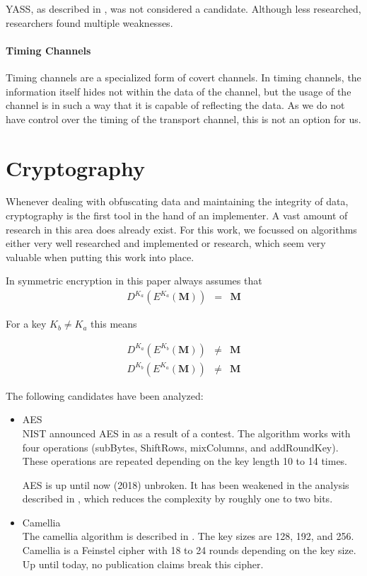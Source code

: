 
YASS, as described in \cite{solanki2007yass}, was not considered a candidate. Although less researched, researchers found multiple weakness\-es\cite{kodovsky2010modern,li2009steganalysis}.

\subsubsection{Timing Channels}

Timing channels are a specialized form of covert channels. In timing channels, the information itself hides not within the data of the channel, but the usage of the channel is in such a way that it is capable of reflecting the data. As we do not have control over the timing of the transport channel, this is not an option for us.

\chapter{Cryptography}

Whenever dealing with obfuscating data and maintaining the integrity of data, cryptography is the first tool in the hand of an implementer. A vast amount of research in this area does already exist. For this work, we focussed on algorithms either very well researched and implemented or research, which seem very valuable when putting this work into place. 

In symmetric encryption in this paper always assumes that
\begin{eqnarray}
D^{K_a}\left(E^{K_a}\left(\mathbf{M}\right)\right) & = & \mathbf{M}
\end{eqnarray} 

For a key $K_b\neq K_a$ this means

\begin{eqnarray}
D^{K_a}\left(E^{K_b}\left(\mathbf{M}\right)\right) & \neq & \mathbf{M}\\
D^{K_b}\left(E^{K_a}\left(\mathbf{M}\right)\right) & \neq & \mathbf{M}
\end{eqnarray} 

The following candidates have been analyzed:
\begin{itemize}
	\item AES\\
	NIST announced AES in \citeyear{standard2001announcing} as a result of a contest. The algorithm works with four operations (subBytes, ShiftRows, mixColumns, and addRoundKey). These operations are repeated depending on the key length 10 to 14 times. 
	
	AES is up until now (2018) unbroken. It has been weakened in the analysis described in \cite{tao2015improving}, which reduces the complexity by roughly one to two bits. 
	
	\item Camellia\\
	The camellia algorithm is described in \cite{RFC3713}. The key sizes are 128, 192, and 256. Camellia is a Feinstel cipher with 18 to 24 rounds depending on the key size. Up until today, no publication claims break this cipher. 
\end{itemize}

